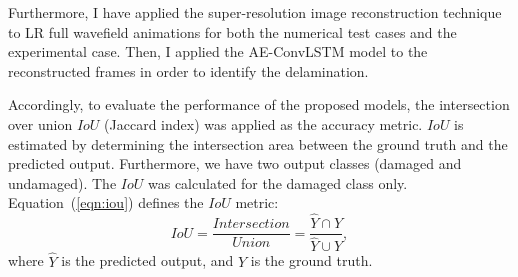 
Furthermore, I have applied the super-resolution image reconstruction technique to LR full wavefield animations for both the numerical test cases and the experimental case. 
Then, I applied the AE-ConvLSTM model to the reconstructed frames in order to identify the delamination.

Accordingly, to evaluate the performance of the proposed models, the intersection over union \(IoU\) (Jaccard index) was applied as the accuracy metric.
\(IoU\) is estimated by determining the intersection area between the ground truth and the predicted output.
Furthermore, we have two output classes (damaged and undamaged). 
The \(IoU\) was calculated for the damaged class only.
Equation~(\ref{eqn:iou}) defines the \(IoU\) metric:
\begin{equation}
	IoU=\frac{Intersection}{Union}=\frac{\hat{Y} \cap Y}{\hat{Y} \cup Y},
	\label{eqn:iou}
\end{equation}
where \(\hat{Y}\) is the predicted output, and \(Y\) is the ground truth.

